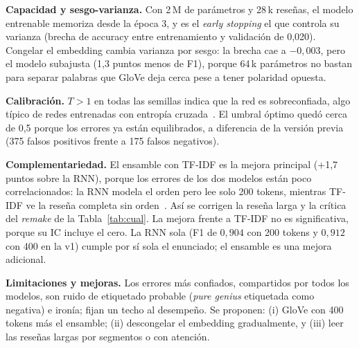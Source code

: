 \documentclass[letterpaper, 10 pt, conference]{ieeeconf}
\begin{document}
\textbf{Capacidad y sesgo-varianza.} Con 2\,M de parámetros y 28\,k reseñas, el modelo entrenable memoriza desde la época 3, y es el \textit{early stopping} el que controla su varianza (brecha de accuracy entre entrenamiento y validación de 0,020). Congelar el embedding cambia varianza por sesgo: la brecha cae a $-0{,}003$, pero el modelo subajusta (1,3 puntos menos de F1), porque 64\,k parámetros no bastan para separar palabras que GloVe deja cerca pese a tener polaridad opuesta.

\textbf{Calibración.} $T>1$ en todas las semillas indica que la red es sobreconfiada, algo típico de redes entrenadas con entropía cruzada~\cite{c12}. El umbral óptimo quedó cerca de 0,5 porque los errores ya están equilibrados, a diferencia de la versión previa (375 falsos positivos frente a 175 falsos negativos).

\textbf{Complementariedad.} El ensamble con TF-IDF es la mejora principal (+1,7 puntos sobre la RNN), porque los errores de los dos modelos están poco correlacionados: la RNN modela el orden pero lee solo 200 tokens, mientras TF-IDF ve la reseña completa sin orden~\cite{c6}. Así se corrigen la reseña larga y la crítica del \textit{remake} de la Tabla~\ref{tab:cual}. La mejora frente a TF-IDF no es significativa, porque su IC incluye el cero. La RNN sola (F1 de $0{,}904$ con 200 tokens y $0{,}912$ con 400 en la v1) cumple por sí sola el enunciado; el ensamble es una mejora adicional.

\textbf{Limitaciones y mejoras.} Los errores más confiados, compartidos por todos los modelos, son ruido de etiquetado probable (\textit{pure genius} etiquetada como negativa) e ironía; fijan un techo al desempeño. Se proponen: (i) GloVe con 400 tokens más el ensamble; (ii) descongelar el embedding gradualmente, y (iii) leer las reseñas largas por segmentos o con atención.
\end{document}
